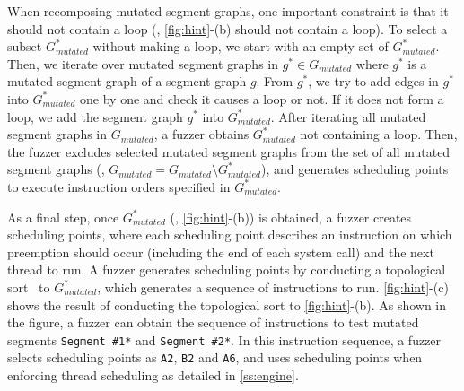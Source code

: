When recomposing mutated segment graphs, one important constraint is
that it should not contain a loop (\ie, \autoref{fig:hint}-(b) should
not contain a loop). 
%
To select a subset $G^*_{mutated}$ without making a loop, we start
with an empty set of $G^*_{mutated}$. Then, we iterate over mutated
segment graphs in $g^* \in G_{mutated}$ where $g^*$ is a mutated
segment graph of a segment graph $g$.  From $g^*$, we try to add edges
in $g^*$ into $G^*_{mutated}$ one by one and check it causes a loop or
not. If it does not form a loop, we add the segment graph $g^*$ into
$G^*_{mutated}$.
%
After iterating all mutated segment graphs in $G_{mutated}$,
a fuzzer obtains $G^*_{mutated}$ not containing a loop. Then, 
the fuzzer excludes selected mutated segment graphs from the set of 
all mutated segment graphs
(\ie, $G_{mutated} = G_{mutated} \setminus G^*_{mutated}$), and
generates scheduling points to execute instruction orders 
specified in $G^*_{mutated}$.


%
As a final step, once $G^{*}_{mutated}$ (\ie, \autoref{fig:hint}-(b))
is obtained, a fuzzer creates scheduling points, where each scheduling
point describes an instruction on which preemption should occur
(including the end of each system call) and the next thread to run.
%
A fuzzer generates scheduling points by conducting a topological
sort~\cite{topologicalsort} to $G^{*}_{mutated}$, which generates a
sequence of instructions to run.
%
\autoref{fig:hint}-(c) shows the result of conducting the topological
sort to \autoref{fig:hint}-(b).
%
As shown in the figure, a fuzzer can obtain the sequence of
instructions to test mutated segments \texttt{Segment \#1*} and
\texttt{Segment \#2*}. In this instruction sequence, a fuzzer selects
scheduling points as \texttt{A2}, \texttt{B2} and \texttt{A6}, and
uses scheduling points when enforcing thread scheduling as detailed in
\autoref{ss:engine}.


%
%




